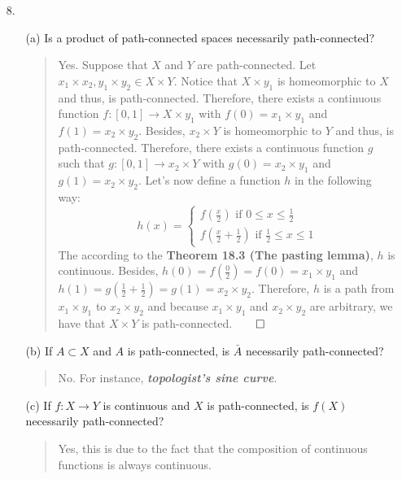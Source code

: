 \documentclass[12pt, a4paper]{article}
\begin{document}
\begin{itemize}
\item[]
\item[]

\item[8.]
\begin{itemize}
\item[(a)]
Is a product of path-connected spaces necessarily path-connected?
\begin{quote}
Yes. Suppose that $X$ and $Y$ are path-connected.
Let $x_1 \times x_2, y_1 \times y_2 \in X \times Y$.
Notice that $X \times y_1$ is homeomorphic to $X$
and thus, is path-connected. Therefore, there exists
a continuous function $f : [0, 1] \to X \times y_1$
with $f(0) = x_1 \times y_1$ and $f(1) = x_2 \times y_2$.
Besides, $x_2 \times Y$ is homeomorphic to $Y$ and thus,
is path-connected. Therefore, there exists a continuous
function $g$ such that $g : [0, 1] \to x_2 \times Y$
with $g(0) = x_2 \times y_1$ and $g(1) = x_2 \times y_2$.
Let's now define a function $h$ in the following way:
$$
h(x) = 
\begin{cases}
f(\frac{x}{2}) \mbox{ if } 0 \leq x \leq \frac{1}{2}\\
f(\frac{x}{2} + \frac{1}{2}) \mbox{ if } \frac{1}{2} \leq x \leq 1
\end{cases}
$$
The according to the \textbf{Theorem 18.3 (The pasting lemma)}, $h$ is continuous. Besides,
$h(0) = f(\frac{0}{2}) = f(0) = x_1 \times y_1$ and $h(1) = g(\frac{1}{2} + \frac{1}{2}) = g(1) = x_2 \times y_2$.
Therefore, $h$ is a path from $x_1 \times y_1$ to $x_2 \times y_2$
and because $x_1 \times y_1$ and $x_2 \times y_2$ are arbitrary, we have that
$X \times Y$ is path-connected.$\qed$
\end{quote}

\item[]
\item[]

\item[(b)]
If $A \subset X$ and $A$ is path-connected, is $\bar{A}$
necessarily path-connected?
\begin{quote}
No. For instance, \textbf{\textit{topologist's sine curve}}.
\end{quote}

\item[]

\item[(c)]
If $f: X \to Y$ is continuous and $X$ is path-connected, is $f(X)$ necessarily path-connected?
\begin{quote}
Yes, this is due to the fact that the composition of continuous functions is always continuous.
\end{quote}


\end{itemize}
\end{itemize}
\end{document}
